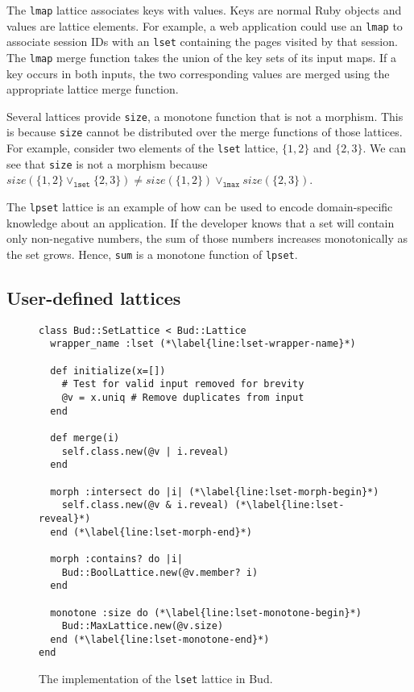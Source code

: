 The \texttt{lmap} lattice associates keys with values. Keys are normal Ruby
objects and values are lattice elements. For example, a web application could
use an \texttt{lmap} to associate session IDs with an \texttt{lset} containing
the pages visited by that session. The \texttt{lmap} merge function takes the
union of the key sets of its input maps. If a key occurs in both inputs, the two
corresponding values are merged using the appropriate lattice merge function.

Several lattices provide \texttt{size}, a monotone function that is not a
morphism. This is because \texttt{size} cannot be distributed over the merge
functions of those lattices. For example, consider two elements of the
\texttt{lset} lattice, $\{1,2\}$ and $\{2,3\}$.  We can see that \texttt{size} is not a morphism because $size(\{1,2\} \lor_{\mathtt{lset}}
\{2,3\}) \ne size(\{1,2\}) \lor_{\mathtt{lmax}} size(\{2,3\})$.

The \texttt{lpset} lattice is an example of how \lang can be used to encode
domain-specific knowledge about an application. If the developer knows that a
set will contain only non-negative numbers, the sum of those numbers increases
monotonically as the set grows. Hence, \texttt{sum} is a monotone function of
\texttt{lpset}.%

\subsection{User-defined lattices}
\begin{figure}[t]
\begin{scriptsize}
\begin{lstlisting}[deletekeywords={lset}]
class Bud::SetLattice < Bud::Lattice
  wrapper_name :lset (*\label{line:lset-wrapper-name}*)

  def initialize(x=[])
    # Test for valid input removed for brevity
    @v = x.uniq # Remove duplicates from input
  end

  def merge(i)
    self.class.new(@v | i.reveal)
  end

  morph :intersect do |i| (*\label{line:lset-morph-begin}*)
    self.class.new(@v & i.reveal) (*\label{line:lset-reveal}*)
  end (*\label{line:lset-morph-end}*)

  morph :contains? do |i|
    Bud::BoolLattice.new(@v.member? i)
  end

  monotone :size do (*\label{line:lset-monotone-begin}*)
    Bud::MaxLattice.new(@v.size)
  end (*\label{line:lset-monotone-end}*)
end
\end{lstlisting}
\end{scriptsize}
\caption{The implementation of the \texttt{lset} lattice in Bud.}
\label{fig:lattice-lset}
\end{figure}

